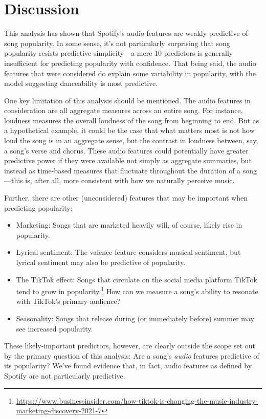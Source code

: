 \documentclass[12pt, twoside]{article}
\begin{document}
\section{Discussion}
This analysis has shown that Spotify's audio features are weakly predictive of song popularity.  In some sense, it's not particularly surprising that song popularity resists predictive simplicity---a mere 10 predictors is generally insufficient for predicting popularity with confidence. That being said, the audio features that were considered do explain some variability in popularity, with the model suggesting danceability is most predictive.  

One key limitation of this analysis should be mentioned. The audio features in consideration are all aggregate measures across an entire song. For instance, loudness measures the overall loudness of the song from beginning to end. But as a hypothetical example, it could be the case that what matters most is not how loud the song is in an aggregate sense, but the contrast in loudness between, say, a song's verse and chorus. These audio features could potentially have greater predictive power if they were available not simply as aggregate summaries, but instead as time-based measures that fluctuate throughout the duration of a song---this is, after all, more consistent with how we naturally perceive music. 

Further, there are other (unconsidered) features that may be important when predicting popularity: 
\begin{itemize}
 \item Marketing: Songs that are marketed heavily will, of course, likely rise in popularity.
  \item Lyrical sentiment: The valence feature considers musical sentiment, but lyrical sentiment  may also be predictive of popularity.
  \item The TikTok effect: Songs that circulate on the social media platform TikTok tend to grow in popularity.\footnote{\href{https://www.businessinsider.com/how-tiktok-is-changing-the-music-industry-marketing-discovery-2021-7}{\small{https://www.businessinsider.com/how-tiktok-is-changing-the-music-industry-marketing-discovery-2021-7}}} How can we measure a song's ability to resonate with TikTok's primary audience?
  \item Seasonality: Songs that release during (or immediately before) summer may see increased popularity.
\end{itemize}

These likely-important predictors, however, are clearly outside the scope set out by the primary question of this analysis: Are a song's \textit{audio} features predictive of its popularity? We've found evidence that, in fact, audio features as defined by Spotify are not particularly predictive. 
\end{document}

